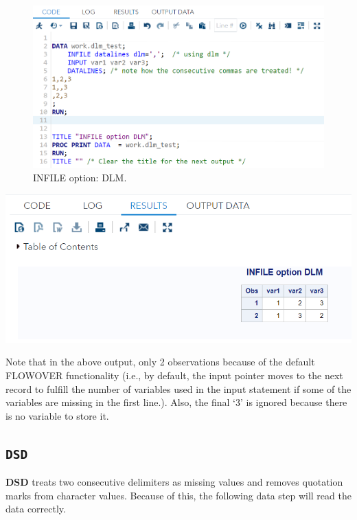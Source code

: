 \documentclass[
]{book}
\begin{document}
\begin{figure}

{\centering \includegraphics[width=1\linewidth]{img04/w04-INFILEoptionDLM} 

}

\caption{INFILE option: DLM.}\label{fig:unnamed-chunk-26}
\end{figure}

\begin{center}\includegraphics[width=1\linewidth]{img04/w04-DLM-output} \end{center}

Note that in the above output, only 2 observations because of the default FLOWOVER functionality (i.e., by default, the input pointer moves to the next record to fulfill the number of variables used in the input statement if some of the variables are missing in the first line.). Also, the final `3' is ignored because there is no variable to store it.

\hypertarget{dsd}{%
\subsection{\texorpdfstring{\texttt{DSD}}{DSD}}\label{dsd}}

\textbf{DSD} treats two consecutive delimiters as missing values and removes quotation marks from character values. Because of this, the following data step will read the data correctly.
\end{document}

